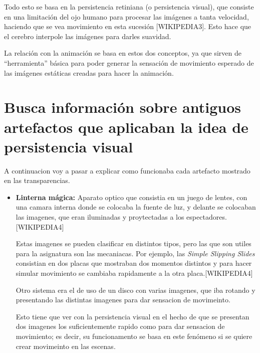 \documentclass{article}
\begin{document}
\bigskip

Todo esto se basa en la persistencia retiniana (o persistencia visual), que consiste en una limitación del ojo humano para procesar las imágenes a tanta velocidad, haciendo que se vea movimiento en esta sucesión [WIKIPEDIA3]. Esto hace que el cerebro interpole las imágenes para darles suavidad.

\bigskip

La relación con la animación se basa en estos dos conceptos, ya que sirven de ``herramienta'' básica para poder generar la sensación de movimiento esperado de las imágenes estáticas creadas para hacer la animación. 


\section{Busca información sobre antiguos artefactos que aplicaban la idea de persistencia visual}

A continuacion voy a pasar a explicar como funcionaba cada artefacto mostrado en las transparencias.

\begin{itemize}
    \item \textbf{Linterna mágica: }Aparato optico que consistia en un juego de lentes, con una camara interna donde se colocaba la fuente de luz, y delante se colocaban las imagenes, que eran iluminadas y proytectadas a los espectadores. [WIKIPEDIA4] 
    
    Estas imagenes se pueden clasificar en distintos tipos, pero las que son utiles para la asignatura son las mecaniacas. Por ejemplo, las \textit{Simple Slipping Slides} consistian en dos placas que mostraban dos momentos distintos y para hacer simular movimiento se cambiaba rapidamente a la otra placa.[WIKIPEDIA4]

    Otro sistema era el de uso de un disco con varias imagenes, que iba rotando y presentando las distintas imagenes para dar sensacion de movimeinto.

    Esto tiene que ver con la persistencia visual en el hecho de que se presentan dos imagenes los suficientemente rapido como para dar sensacion de movimiento; es decir, su funcionamento se basa en este fenómeno si se quiere crear movimeinto en las escenas.
\end{itemize}
\end{document}
